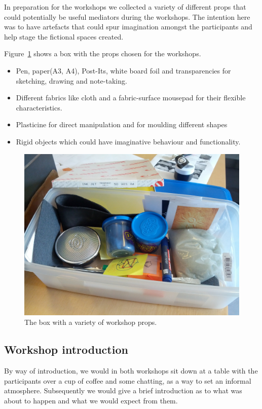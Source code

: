 In preparation for the workshops we collected a variety of different props that could potentially be useful mediators during the workshops.
The intention here was to have artefacts that could spur imagination amongst the participants and help stage the fictional spaces created.

Figure~\ref{ch:workshops:props-box} shows a box with the props chosen for the workshops.

\begin{itemize}
  \item{Pen, paper(A3, A4), Post-Its, white board foil and transparencies for sketching, drawing and note-taking.}
  \item{Different fabrics like cloth and a fabric-surface mousepad for their flexible characteristics.}
  \item{Plasticine for direct manipulation and for moulding different shapes}
  \item{Rigid objects which could have imaginative behaviour and functionality.}
\end{itemize}

\begin{figure}[hb]
  \centering
    \includegraphics[width=.9\textwidth]{workshops/props-box}
    \caption[A box with a variety of workshop props.] %
  {The box with a variety of workshop props.} %
  \label{ch:workshops:props-box}
\end{figure}

\subsection{Workshop introduction}
\label{ch:workshops:approach:introduction}
By way of introduction, we would in both workshops sit down at a table with the participants over a cup of coffee and some chatting, as a way to set an informal atmosphere.
Subsequently we would give a brief introduction as to what was about to happen and what we would expect from them.

